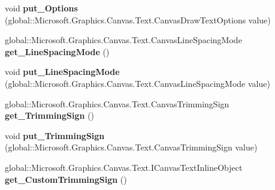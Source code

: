 \begin{DoxyCompactItemize}
\item 
\mbox{\label{interface_microsoft_1_1_graphics_1_1_canvas_1_1_text_1_1_i_canvas_text_layout_a2d49e25d90aae82a410bddfc947d5a20}} 
void {\bfseries put\+\_\+\+Options} (global\+::\+Microsoft.\+Graphics.\+Canvas.\+Text.\+Canvas\+Draw\+Text\+Options value)
\item 
\mbox{\label{interface_microsoft_1_1_graphics_1_1_canvas_1_1_text_1_1_i_canvas_text_layout_adf0a5326f22b270c50010a147728dbf0}} 
global\+::\+Microsoft.\+Graphics.\+Canvas.\+Text.\+Canvas\+Line\+Spacing\+Mode {\bfseries get\+\_\+\+Line\+Spacing\+Mode} ()
\item 
\mbox{\label{interface_microsoft_1_1_graphics_1_1_canvas_1_1_text_1_1_i_canvas_text_layout_a36fefc4917fac46be5776c84bed1b9de}} 
void {\bfseries put\+\_\+\+Line\+Spacing\+Mode} (global\+::\+Microsoft.\+Graphics.\+Canvas.\+Text.\+Canvas\+Line\+Spacing\+Mode value)
\item 
\mbox{\label{interface_microsoft_1_1_graphics_1_1_canvas_1_1_text_1_1_i_canvas_text_layout_aad4b6c408a3d13911d9e3f2963901bfe}} 
global\+::\+Microsoft.\+Graphics.\+Canvas.\+Text.\+Canvas\+Trimming\+Sign {\bfseries get\+\_\+\+Trimming\+Sign} ()
\item 
\mbox{\label{interface_microsoft_1_1_graphics_1_1_canvas_1_1_text_1_1_i_canvas_text_layout_a8c2b11a3188f814249a73e55f40fd37b}} 
void {\bfseries put\+\_\+\+Trimming\+Sign} (global\+::\+Microsoft.\+Graphics.\+Canvas.\+Text.\+Canvas\+Trimming\+Sign value)
\item 
\mbox{\label{interface_microsoft_1_1_graphics_1_1_canvas_1_1_text_1_1_i_canvas_text_layout_a78438d223733b9e461f4db23c339b79e}} 
global\+::\+Microsoft.\+Graphics.\+Canvas.\+Text.\+I\+Canvas\+Text\+Inline\+Object {\bfseries get\+\_\+\+Custom\+Trimming\+Sign} ()
\item 

\end{DoxyCompactItemize}
